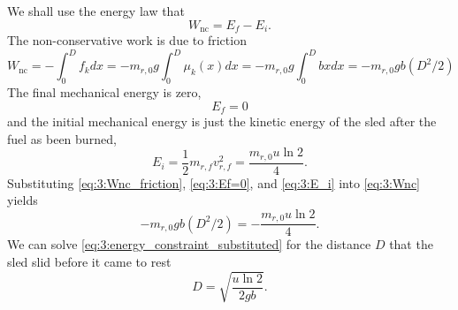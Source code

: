 \documentclass[solutions]{esg8012exam}
\begin{document}
\begin{enumerate}[(a)]
      We shall use the energy law that
      \begin{equation} W_\text{nc} =E_f -E_i . \label{eq:3:Wnc} \end{equation}
      The non-conservative work is due to friction
      \begin{equation} W_\text{nc} =-\int_0^D {f_k } dx=-m_{r,0} g\int_0^D {\mu_k (x)} dx=-m_{r,0} g\int_0^D {bx} dx=-m_{r,0} gb(D^2/2) \label{eq:3:Wnc_friction} \end{equation}
      The final mechanical energy is zero,
      \begin{equation} E_f =0 \label{eq:3:Ef=0} \end{equation}
      and the initial mechanical energy is just the kinetic energy of the sled after the fuel as been burned,
      \begin{equation} E_i =\frac{1}{2}m_{r,f} v_{r,f}^2=\frac{m_{r,0} u\ln 2}{4}. \label{eq:3:E_i} \end{equation}
      Substituting \autoref{eq:3:Wnc_friction}, \autoref{eq:3:Ef=0}, and \autoref{eq:3:E_i} into \autoref{eq:3:Wnc} yields
      \begin{equation} -m_{r,0} gb(D^2/2)=-\frac{m_{r,0} u\ln 2}{4}. \label{eq:3:energy_constraint_substituted} \end{equation}
      We can solve \autoref{eq:3:energy_constraint_substituted} for the distance $D$ that the sled slid before it came to rest
      \begin{equation} D=\sqrt {\frac{u\ln 2}{2gb}} . \label{eq:3:D} \end{equation}
  \end{enumerate}
\clearpage
\end{document}
